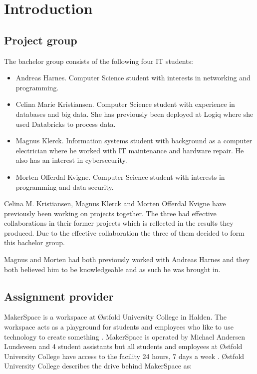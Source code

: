 \chapter{Introduction}

\section{Project group}
The bachelor group consists of the following four IT students:
\begin{itemize}
    \item Andreas Harnes. 
    Computer Science student with interests in networking and programming.
    \item Celina Marie Kristiansen.
    Computer Science student with experience in databases and big data.
    She has previously been deployed at Logiq where she used Databricks to process data.
    \item Magnus Klerck.
    Information systems student with background as a computer electrician where he worked with IT maintenance and hardware repair.
    He also has an interest in cybersecurity.
    \item Morten Offerdal Kvigne.
    Computer Science student with interests in programming and data security.
\end{itemize}
Celina M. Kristiansen, Magnus Klerck and Morten Offerdal Kvigne have previously been working on projects together.
The three had effective collaborations in their former projects which is reflected in the results they produced.
Due to the effective collaboration the three of them decided to form this bachelor group.

Magnus and Morten had both previously worked with Andreas Harnes and they both believed him to be knowledgeable and as such he was brought in.

\section{Assignment provider}
MakerSpace is a workspace at Østfold University College in Halden. 
The workspace acts as a playground for students and employees who like to use technology to create something \cite{what-is-makerspace}.
MakerSpace is operated by Michael Andersen Lundsveen and 4 student assistants but all students and employees at Østfold University College have access to the facility 24 hours, 7 days a week
\cite{what-is-makerspace}.
Østfold University College describes the drive behind MakerSpace as:

